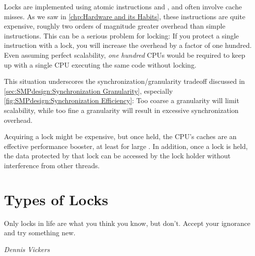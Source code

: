 Locks are implemented using atomic instructions and ,
and often involve cache misses.
As we saw in \cref{chp:Hardware and its Habits},
these instructions are quite expensive, roughly two
orders of magnitude greater overhead than simple instructions.
This can be a serious problem for locking: If you protect a single
instruction with a lock, you will increase the overhead by a factor
of one hundred.
Even assuming perfect scalability, \emph{one hundred} CPUs would
be required to keep up with a single CPU executing the same code
without locking.

This situation underscores the synchronization\-/granularity
tradeoff discussed in \cref{sec:SMPdesign:Synchronization Granularity},
especially \cref{fig:SMPdesign:Synchronization Efficiency}:
Too coarse a granularity will limit scalability, while too fine a
granularity will result in excessive synchronization overhead.

Acquiring a lock might be expensive, but once held, the CPU's caches
are an effective performance booster, at least for large .
In addition, once a lock is held, the data protected by that lock can
be accessed by the lock holder without interference from other threads.

\QuickQuizEnd

\section{Types of Locks}
\label{sec:locking:Types of Locks}
%
\epigraph{Only locks in life are what you think you know, but don't.
	  Accept your ignorance and try something new.}
	 {\emph{Dennis Vickers}}

